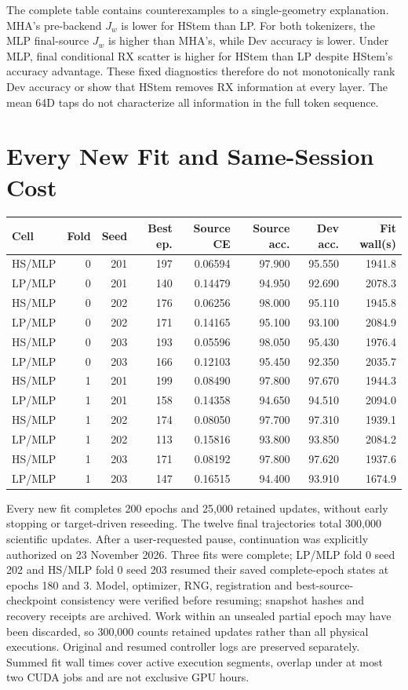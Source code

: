 \documentclass[10pt]{article}
\begin{document}
The complete table contains counterexamples to a single-geometry explanation. MHA's pre-backend $J_w$ is lower for HStem than LP. For both tokenizers, the MLP final-source $J_w$ is higher than MHA's, while Dev accuracy is lower. Under MLP, final conditional RX scatter is higher for HStem than LP despite HStem's accuracy advantage. These fixed diagnostics therefore do not monotonically rank Dev accuracy or show that HStem removes RX information at every layer. The mean 64D taps do not characterize all information in the full token sequence.
\clearpage
\section{Every New Fit and Same-Session Cost}
\begin{center}\small\begin{tabular}{lrrrrrrr}\toprule
Cell&Fold&Seed&Best ep.&Source CE&Source acc.&Dev acc.&Fit wall(s)\\\midrule
HS/MLP & 0 & 201 & 197 & 0.06594 & 97.900 & 95.550 & 1941.8\\
LP/MLP & 0 & 201 & 140 & 0.14479 & 94.950 & 92.690 & 2078.3\\
HS/MLP & 0 & 202 & 176 & 0.06256 & 98.000 & 95.110 & 1945.8\\
LP/MLP & 0 & 202 & 171 & 0.14165 & 95.100 & 93.100 & 2084.9\\
HS/MLP & 0 & 203 & 193 & 0.05596 & 98.050 & 95.430 & 1976.4\\
LP/MLP & 0 & 203 & 166 & 0.12103 & 95.450 & 92.350 & 2035.7\\
HS/MLP & 1 & 201 & 199 & 0.08490 & 97.800 & 97.670 & 1944.3\\
LP/MLP & 1 & 201 & 158 & 0.14358 & 94.650 & 94.510 & 2094.0\\
HS/MLP & 1 & 202 & 174 & 0.08050 & 97.700 & 97.310 & 1939.1\\
LP/MLP & 1 & 202 & 113 & 0.15816 & 93.800 & 93.850 & 2084.2\\
HS/MLP & 1 & 203 & 171 & 0.08192 & 97.800 & 97.620 & 1937.6\\
LP/MLP & 1 & 203 & 147 & 0.16515 & 94.400 & 93.910 & 1674.9\\
\bottomrule\end{tabular}\end{center}
Every new fit completes 200 epochs and 25,000 retained updates, without early stopping or target-driven reseeding. The twelve final trajectories total 300,000 scientific updates. After a user-requested pause, continuation was explicitly authorized on 23 November 2026. Three fits were complete; LP/MLP fold 0 seed 202 and HS/MLP fold 0 seed 203 resumed their saved complete-epoch states at epochs 180 and 3. Model, optimizer, RNG, registration and best-source-checkpoint consistency were verified before resuming; snapshot hashes and recovery receipts are archived. Work within an unsealed partial epoch may have been discarded, so 300,000 counts retained updates rather than all physical executions. Original and resumed controller logs are preserved separately. Summed fit wall times cover active execution segments, overlap under at most two CUDA jobs and are not exclusive GPU hours.
\end{document}
